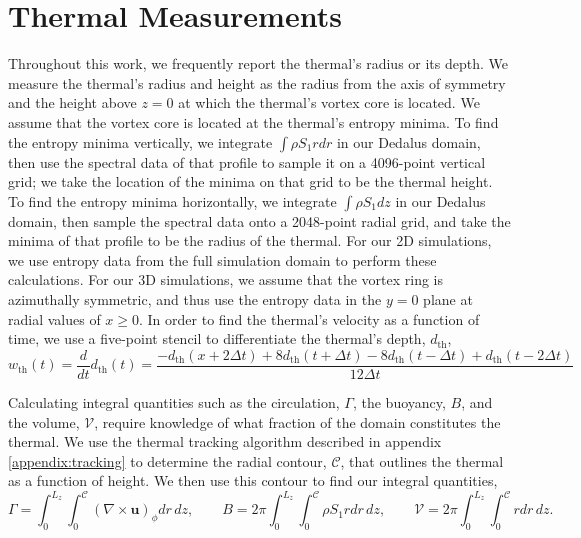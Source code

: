 \documentclass[twocolumn, amsmath, amsfonts, amssymb, trackchanges]{aastex62}
\newcommand{\grad}{\ensuremath{\nabla}}
\begin{document}
\appendix
\section{Thermal Measurements}
\label{appendix:measurements}
Throughout this work, we frequently report the thermal's radius or its depth.
We measure the thermal's radius and height as the radius from the axis of symmetry and the height above $z = 0$ at which the thermal's vortex core is located.
We assume that the vortex core is located at the thermal's entropy minima.
To find the entropy minima vertically, we integrate $\int\rho S_1 r dr$ in our Dedalus domain, then use the spectral data of that profile to sample it on a 4096-point vertical grid; we take the location of the minima on that grid to be the thermal height.
To find the entropy minima horizontally, we integrate $\int \rho S_1 dz$ in our Dedalus domain, then sample the spectral data onto a 2048-point radial grid, and take the minima of that profile to be the radius of the thermal.
For our 2D simulations, we use entropy data from the full simulation domain to perform these calculations.
For our 3D simulations, we assume that the vortex ring is azimuthally symmetric, and thus use the entropy data in the $y = 0$ plane at radial values of $x \geq 0$.
In order to find the thermal's velocity as a function of time, we use a five-point stencil to differentiate the thermal's depth, $d_{\text{th}}$,
$$
w_{\text{th}}(t) = \frac{d }{dt}d_{\text{th}}(t) = \frac{-d_{\text{th}}(x + 2\Delta t) + 8d_{\text{th}}(t + \Delta t) - 8 d_{\text{th}}(t - \Delta t) + d_{\text{th}}(t - 2\Delta t)}{12\Delta t}
$$

Calculating integral quantities such as the circulation, $\Gamma$, the buoyancy, $B$, and the volume, $\mathcal{V}$, require knowledge of what fraction of the domain constitutes the thermal.
We use the thermal tracking algorithm described in appendix \ref{appendix:tracking} to determine the radial contour, $\mathcal{C}$, that outlines the thermal as a function of height.
We then use this contour to find our integral quantities,
\begin{equation}
\Gamma = \int_0^{L_z}\int_0^{\mathcal{C}} (\grad\times\bm{u})_\phi dr\,dz, \qquad
B      = 2\pi \int_0^{L_z}\int_0^{\mathcal{C}} \rho S_1 r dr\,dz, \qquad
\mathcal{V} = 2\pi \int_0^{L_z}\int_0^{\mathcal{C}}r dr\,dz.
\end{equation}
\end{document}
